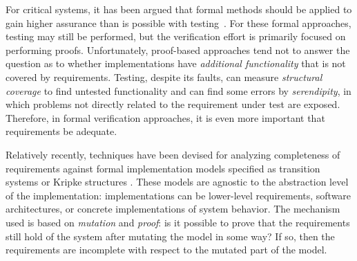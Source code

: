 

For critical systems, it has been argued that formal methods
should be applied to gain higher assurance than is possible with testing~\cite{Miller10:CACM,Rushby09:SEFM,Hardin09:Security}.  For these formal approaches, testing may still be performed, but the verification effort is primarily focused on performing proofs.  Unfortunately, proof-based approaches tend not to answer the question as to whether implementations have {\em additional functionality} that is not covered by requirements.  Testing, despite its faults, can measure {\em structural coverage} to find untested functionality and can find some errors by {\em serendipity}, in which problems not directly related to the requirement under test are exposed.  Therefore, in formal verification approaches, it is even more important that requirements be adequate.

Relatively recently, techniques have been devised for analyzing completeness of requirements against formal implementation models specified as transition systems or Kripke structures \cite{chockler2001practical,das2005formal, claessen2007coverage, grosse2007estimating}.  These models are agnostic to the abstraction level of the implementation: implementations can be lower-level requirements, software architectures, or concrete implementations of system behavior.  The mechanism used is based on {\em mutation} and {\em proof}: is it possible to prove that the requirements still hold of the system after mutating the model in some way?  If so, then the requirements are incomplete with respect to the mutated part of the model.

